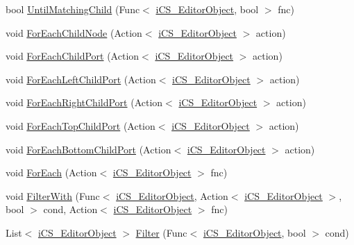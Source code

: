 \begin{DoxyCompactItemize}
bool \hyperlink{classi_c_s___editor_object_ab12d90ae7abc73f57a51d571b60d0e75}{Until\+Matching\+Child} (Func$<$ \hyperlink{classi_c_s___editor_object}{i\+C\+S\+\_\+\+Editor\+Object}, bool $>$ fnc)
\item 
void \hyperlink{classi_c_s___editor_object_a8fcfb581d0dbe715515c28e9f3e29cf3}{For\+Each\+Child\+Node} (Action$<$ \hyperlink{classi_c_s___editor_object}{i\+C\+S\+\_\+\+Editor\+Object} $>$ action)
\item 
void \hyperlink{classi_c_s___editor_object_afda49e8e002739ba8132ee87fc020494}{For\+Each\+Child\+Port} (Action$<$ \hyperlink{classi_c_s___editor_object}{i\+C\+S\+\_\+\+Editor\+Object} $>$ action)
\item 
void \hyperlink{classi_c_s___editor_object_a9f1df410d5ee3d18edf627f527c22f57}{For\+Each\+Left\+Child\+Port} (Action$<$ \hyperlink{classi_c_s___editor_object}{i\+C\+S\+\_\+\+Editor\+Object} $>$ action)
\item 
void \hyperlink{classi_c_s___editor_object_a67857d009bd39851f125c679405122e5}{For\+Each\+Right\+Child\+Port} (Action$<$ \hyperlink{classi_c_s___editor_object}{i\+C\+S\+\_\+\+Editor\+Object} $>$ action)
\item 
void \hyperlink{classi_c_s___editor_object_a674635984ebc5a169d4a132a66c2044d}{For\+Each\+Top\+Child\+Port} (Action$<$ \hyperlink{classi_c_s___editor_object}{i\+C\+S\+\_\+\+Editor\+Object} $>$ action)
\item 
void \hyperlink{classi_c_s___editor_object_abf25fde216d6b73db9de1bf35251c23e}{For\+Each\+Bottom\+Child\+Port} (Action$<$ \hyperlink{classi_c_s___editor_object}{i\+C\+S\+\_\+\+Editor\+Object} $>$ action)
\item 
void \hyperlink{classi_c_s___editor_object_a31d659f6305feab07addb56d69b805f9}{For\+Each} (Action$<$ \hyperlink{classi_c_s___editor_object}{i\+C\+S\+\_\+\+Editor\+Object} $>$ fnc)
\item 
void \hyperlink{classi_c_s___editor_object_a458ca5af15a7246ff5a9efe0fe49b922}{Filter\+With} (Func$<$ \hyperlink{classi_c_s___editor_object}{i\+C\+S\+\_\+\+Editor\+Object}, Action$<$ \hyperlink{classi_c_s___editor_object}{i\+C\+S\+\_\+\+Editor\+Object} $>$, bool $>$ cond, Action$<$ \hyperlink{classi_c_s___editor_object}{i\+C\+S\+\_\+\+Editor\+Object} $>$ fnc)
\item 
List$<$ \hyperlink{classi_c_s___editor_object}{i\+C\+S\+\_\+\+Editor\+Object} $>$ \hyperlink{classi_c_s___editor_object_ab597541ee64fddf73ff3fb3306426933}{Filter} (Func$<$ \hyperlink{classi_c_s___editor_object}{i\+C\+S\+\_\+\+Editor\+Object}, bool $>$ cond)

\end{DoxyCompactItemize}
